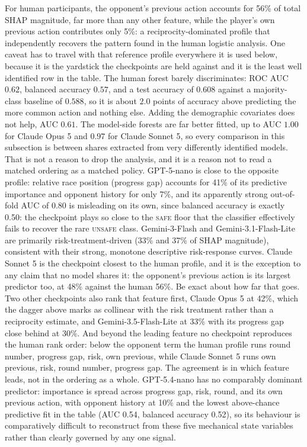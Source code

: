 \documentclass[sigconf,anonymous]{aamas}
\newcommand{\Safe}{\textsc{safe}}
\newcommand{\Unsafe}{\textsc{unsafe}}
\begin{document}
For human participants, the opponent's previous action accounts for 56\%
of total SHAP magnitude, far more than any other feature, while the
player's own previous action contributes only 5\%: a reciprocity-dominated
profile that independently recovers the pattern found in the human
logistic analysis. One caveat has to travel with that reference profile
everywhere it is used below, because it is the yardstick the checkpoints are
held against and it is the least well identified row in the table. The human
forest barely discriminates: ROC AUC $0.62$, balanced accuracy $0.57$, and a
test accuracy of $0.608$ against a majority-class baseline of $0.588$, so it
is about $2.0$ points of accuracy above predicting the more common action and
nothing else. Adding the demographic covariates does not help, AUC $0.61$.
The model-side forests are far better fitted, up to AUC $1.00$ for Claude
Opus 5 and $0.97$ for Claude Sonnet 5, so every comparison in this subsection
is between shares extracted from very differently identified models. That is
not a reason to drop the analysis, and it is a reason not to read a matched
ordering as a matched policy. GPT-5-nano is close to the opposite profile: relative
race position (progress gap) accounts for 41\% of its predictive
importance and opponent history for only 7\%, and its apparently strong
out-of-fold AUC of 0.80 is misleading on its own, since balanced accuracy is
exactly 0.50: the checkpoint plays so close to the \Safe{} floor that the
classifier effectively fails to recover the rare \Unsafe{} class.
Gemini-3-Flash and Gemini-3.1-Flash-Lite are primarily
risk-treatment-driven (33\%
and 37\% of SHAP magnitude), consistent with their strong, monotone
descriptive risk-response curves. Claude Sonnet 5 is the checkpoint closest to
the human profile, and it is the exception to any claim that no model shares
it: the opponent's previous action is its largest predictor too, at 48\%
against the human 56\%. Be exact about how far that goes. Two other
checkpoints also rank that feature first, Claude Opus 5 at 42\%, which the
dagger above marks as collinear with the risk treatment rather than a
reciprocity estimate, and Gemini-3.5-Flash-Lite at 33\% with its progress gap
close behind at 30\%. And beyond the leading feature no checkpoint reproduces
the human rank order: below the opponent term the human profile runs round
number, progress gap, risk, own previous, while Claude Sonnet 5 runs own
previous, risk, round number, progress gap. The agreement is in which feature
leads, not in the ordering as a whole. GPT-5.4-nano has no
comparably dominant predictor: importance is
spread across progress gap, risk, round, and its own previous action,
with opponent history at 10\% and the lowest above-chance predictive
fit in the table (AUC 0.54, balanced accuracy 0.52), so its behaviour is
comparatively difficult to reconstruct from these five mechanical state
variables rather than clearly governed by any one signal.
\end{document}
